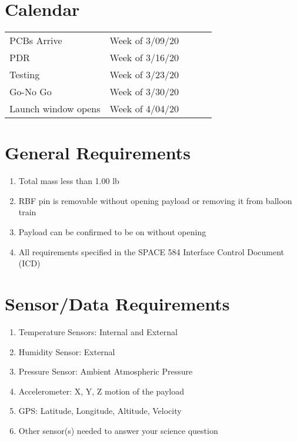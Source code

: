 \documentclass[12pt]{article}
\begin{document}
	\maketitle
	\thispagestyle{fancy}
    
    \section*{Calendar}
        \begin{table}[h]
        \begin{tabular}{lllll}
        PCBs Arrive & Week of 3/09/20  &  &  &  \\
        PDR         & Week of 3/16/20 &  &  &  \\
        Testing     & Week of 3/23/20 &  &  &  \\
        Go-No Go     & Week of 3/30/20 &  &  &  \\
        Launch window opens & Week of 4/04/20 &  &  &
        \end{tabular}
        \end{table}
    
    \section*{General Requirements}
    \begin{enumerate}
        \item Total mass less than 1.00 lb
        \item RBF pin is removable without opening payload or removing it from balloon train
        \item Payload can be confirmed to be on without opening
        \item All requirements specified in the SPACE 584 Interface Control Document (ICD)
    \end{enumerate}
    
    \section*{Sensor/Data Requirements}
    \begin{enumerate}
        \item Temperature Sensors: Internal and External
        \item Humidity Sensor: External
        \item Pressure Sensor: Ambient Atmospheric Pressure
        \item Accelerometer: X, Y, Z motion of the payload
        \item GPS: Latitude, Longitude, Altitude, Velocity
        \item Other sensor(s) needed to answer your science question
        
    \end{enumerate}
    
\end{document}

